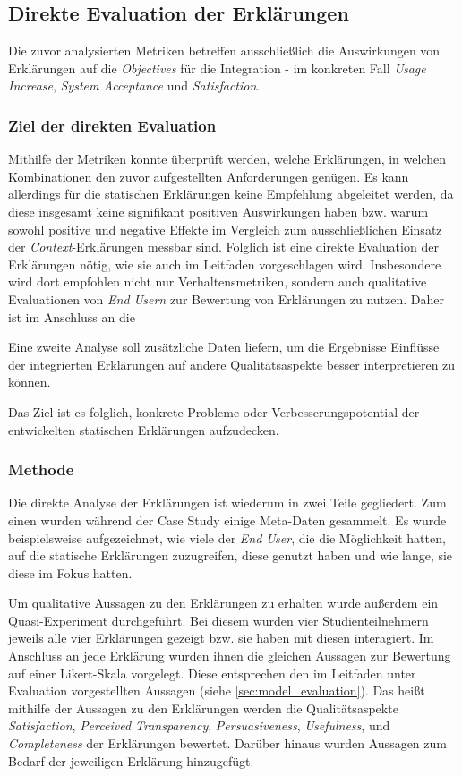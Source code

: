 \subsection{Direkte Evaluation der Erklärungen}
\label{sec:study_results_qualitativ}

Die zuvor analysierten Metriken betreffen ausschließlich die Auswirkungen von Erklärungen auf die \textit{Objectives} für die Integration - im konkreten Fall \textit{Usage Increase}, \textit{System Acceptance} und \textit{Satisfaction}.

\subsubsection{Ziel der direkten Evaluation}

Mithilfe der Metriken konnte überprüft werden, welche Erklärungen, in welchen Kombinationen den zuvor aufgestellten Anforderungen genügen. Es kann allerdings für die statischen Erklärungen keine Empfehlung abgeleitet werden, da diese insgesamt keine signifikant positiven Auswirkungen haben bzw. warum sowohl positive und negative Effekte im Vergleich zum ausschließlichen Einsatz der \textit{Context}-Erklärungen messbar sind. Folglich ist eine direkte Evaluation der Erklärungen nötig, wie sie auch im Leitfaden vorgeschlagen wird. Insbesondere wird dort empfohlen nicht nur Verhaltensmetriken, sondern auch qualitative Evaluationen von \textit{End Usern} zur Bewertung von Erklärungen zu nutzen. Daher ist im Anschluss an die 

Eine zweite Analyse soll zusätzliche Daten liefern, um die Ergebnisse Einflüsse der integrierten Erklärungen auf andere Qualitätsaspekte besser interpretieren zu können.

Das Ziel ist es folglich, konkrete Probleme oder Verbesserungspotential der entwickelten statischen Erklärungen aufzudecken.

\subsubsection{Methode}

Die direkte Analyse der Erklärungen ist wiederum in zwei Teile gegliedert. Zum einen wurden während der Case Study einige Meta-Daten gesammelt. Es wurde beispielsweise aufgezeichnet, wie viele der \textit{End User}, die die Möglichkeit hatten, auf die statische Erklärungen zuzugreifen, diese genutzt haben und wie lange, sie diese im Fokus hatten.

Um qualitative Aussagen zu den Erklärungen zu erhalten wurde außerdem ein Quasi-Experiment durchgeführt. Bei diesem wurden vier Studienteilnehmern jeweils alle vier Erklärungen gezeigt bzw. sie haben mit diesen interagiert. Im Anschluss an jede Erklärung wurden ihnen die gleichen Aussagen zur Bewertung auf einer Likert-Skala vorgelegt. Diese entsprechen den im Leitfaden unter Evaluation vorgestellten Aussagen (siehe \autoref{sec:model_evaluation}). Das heißt mithilfe der Aussagen zu den Erklärungen werden die Qualitätsaspekte \textit{Satisfaction}, \textit{Perceived Transparency}, \textit{Persuasiveness}, \textit{Usefulness}, und \textit{Completeness} der Erklärungen bewertet. Darüber hinaus wurden Aussagen zum Bedarf der jeweiligen Erklärung hinzugefügt.

